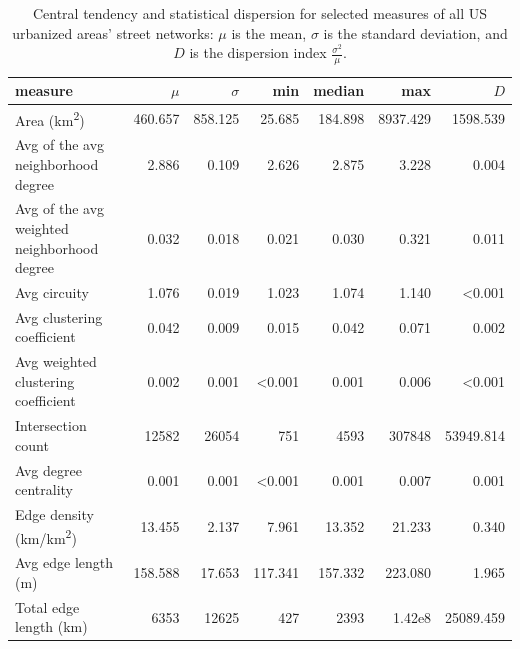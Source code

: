 \documentclass[Afour,sageh,times]{sagej}
\begin{document}
\begin{table}
\centering
\caption{Central tendency and statistical dispersion for selected measures of all US urbanized areas' street networks: $\mu$ is the mean, $\sigma$ is the standard deviation, and $D$ is the dispersion index $\frac{\sigma ^ 2}{\mu}$.}
\label{tab:measures_urban_areas}
\begin{tabular}{ l r r r r r r }
	\toprule
	measure                                          & $\mu$          & $\sigma$       & min            & median         & max            & $D$            \\
	\midrule
	Area (km\textsuperscript{2})                     & 460.657        & 858.125        & 25.685         & 184.898        & 8937.429       & 1598.539       \\
	Avg of the avg neighborhood degree               & 2.886          & 0.109          & 2.626          & 2.875          & 3.228          & 0.004          \\
	Avg of the avg weighted neighborhood degree      & 0.032          & 0.018          & 0.021          & 0.030          & 0.321          & 0.011          \\
	Avg circuity                                     & 1.076          & 0.019          & 1.023          & 1.074          & 1.140          & \textless0.001 \\
	Avg clustering coefficient                       & 0.042          & 0.009          & 0.015          & 0.042          & 0.071          & 0.002          \\
	Avg weighted clustering coefficient              & 0.002          & 0.001          & \textless0.001 & 0.001          & 0.006          & \textless0.001 \\
	Intersection count                               & 12582          & 26054          & 751            & 4593           & 307848         & 53949.814      \\
	Avg degree centrality                            & 0.001          & 0.001          & \textless0.001 & 0.001          & 0.007          & 0.001          \\
	Edge density (km/km\textsuperscript{2})          & 13.455         & 2.137          & 7.961          & 13.352         & 21.233         & 0.340          \\
	Avg edge length (m)                              & 158.588        & 17.653         & 117.341        & 157.332        & 223.080        & 1.965          \\
	Total edge length (km)                           & 6353           & 12625          & 427            & 2393           & 1.42e8         & 25089.459      \\

\end{tabular}
\end{table}
\end{document}
